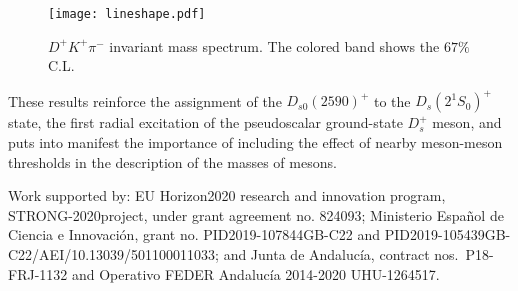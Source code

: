 \documentclass[aps, prd, floatfix, twocolumn, superscriptaddress, nofootinbib]{revtex4-1}
\begin{document}
 

\begin{figure}[!t]
\centering
\texttt{[image: lineshape.pdf]}
%
\caption{\label{fig:lineshape} $D^+K^+\pi^-$ invariant mass spectrum. The colored band shows the $67\%$ C.L.}
\end{figure}









These results reinforce the assignment of the $D_{s0}(2590)^+$ to the $D_s(2^1S_0)^+$ state, the first radial excitation of the pseudoscalar ground-state $D_s^+$ meson, and puts into manifest the importance of including
the effect of nearby meson-meson thresholds in the description of the masses of mesons.



\begin{acknowledgments}
Work supported by:
%
EU Horizon2020 research and innovation program, STRONG-2020project, under grant agreement no. 824093;
%
Ministerio Espa\~nol de Ciencia e Innovaci\'on, grant no. PID2019-107844GB-C22 and PID2019-105439GB-C22/AEI/10.13039/501100011033;
%
and Junta de Andaluc\'ia, contract nos.\ P18-FRJ-1132 and Operativo FEDER Andaluc\'ia 2014-2020 UHU-1264517.
\end{acknowledgments}





\end{document}
